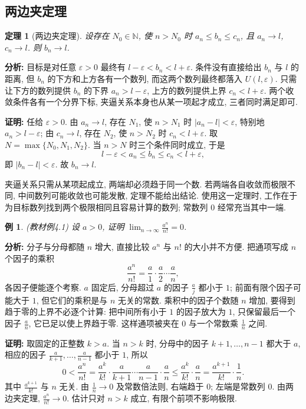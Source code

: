 \documentclass[UTF8,openany]{ctexbook}
\theoremstyle{chinesetextbook}
\newtheorem{example}{例}[section]
\newtheorem{theorem}{定理}[section]
\newenvironment{cnproof}{\par\indent\textbf{证明:} \ignorespaces}{\par}
\begin{document}
\subsection{两边夹定理}
\begin{theorem}[两边夹定理]
设存在 $N_0\in\mathbb N$, 使 $n>N_0$ 时 $a_n\le b_n\le c_n$, 且 $a_n\to l$, $c_n\to l$. 则 $b_n\to l$.
\end{theorem}
\par\indent\textbf{分析:} 目标是对任意 $\varepsilon>0$ 最终有 $l-\varepsilon<b_n<l+\varepsilon$. 条件没有直接给出 $b_n$ 与 $l$ 的距离, 但 $b_n$ 的下方和上方各有一个数列, 而这两个数列最终都落入 $U(l,\varepsilon)$. 只需让下方的数列提供 $b_n$ 的下界 $a_n>l-\varepsilon$, 上方的数列提供上界 $c_n<l+\varepsilon$. 两个收敛条件各有一个分界下标, 夹逼关系本身也从某一项起才成立, 三者同时满足即可.
\begin{cnproof}
任给 $\varepsilon>0$. 由 $a_n\to l$, 存在 $N_1$, 使 $n>N_1$ 时 $|a_n-l|<\varepsilon$, 特别地 $a_n>l-\varepsilon$; 由 $c_n\to l$, 存在 $N_2$, 使 $n>N_2$ 时 $c_n<l+\varepsilon$. 取 $N=\max\{N_0,N_1,N_2\}$. 当 $n>N$ 时三个条件同时成立, 于是
\[
l-\varepsilon<a_n\le b_n\le c_n<l+\varepsilon,
\]
即 $|b_n-l|<\varepsilon$. 故 $b_n\to l$.
\end{cnproof}
夹逼关系只需从某项起成立, 两端却必须趋于同一个数. 若两端各自收敛而极限不同, 中间数列可能收敛也可能发散, 定理不能给出结论. 使用这一定理时, 工作在于为目标数列找到两个极限相同且容易计算的数列; 常数列 $0$ 经常充当其中一端.
\begin{example}
\textnormal{(教材例4.1)} 设 $a>0$, 证明 $\displaystyle \lim_{n\to\infty}\frac{a^n}{n!}=0$.
\end{example}
\par\indent\textbf{分析:} 分子与分母都随 $n$ 增大, 直接比较 $a^n$ 与 $n!$ 的大小并不方便. 把通项写成 $n$ 个因子的乘积
\[
\frac{a^n}{n!}=\frac a1\cdot\frac a2\cdots\frac an,
\]
各因子便能逐个考察. $a$ 固定后, 分母超过 $a$ 的因子 $\displaystyle\frac aj$ 都小于 $1$; 前面有限个因子可能大于 $1$, 但它们的乘积是与 $n$ 无关的常数. 乘积中的因子个数随 $n$ 增加, 要得到趋于零的上界不必逐个计算: 把中间所有小于 $1$ 的因子放大为 $1$, 只保留最后一个因子 $\displaystyle\frac an$, 它已足以使上界趋于零. 这样通项被夹在 $0$ 与一个常数乘 $\displaystyle\frac1n$ 之间.
\begin{cnproof}
取固定的正整数 $k>a$. 当 $n>k$ 时, 分母中的因子 $k+1,\ldots,n-1$ 都大于 $a$, 相应的因子 $\displaystyle\frac a{k+1},\ldots,\frac a{n-1}$ 都小于 $1$, 所以
\[
0<\frac{a^n}{n!}
=\frac{a^k}{k!}\cdot\frac a{k+1}\cdots\frac a{n-1}\cdot\frac an
\le\frac{a^k}{k!}\cdot\frac an
=\frac{a^{k+1}}{k!}\cdot\frac1n.
\]
其中 $\displaystyle\frac{a^{k+1}}{k!}$ 与 $n$ 无关. 由 $\displaystyle\frac1n\to0$ 及常数倍法则, 右端趋于 $0$; 左端是常数列 $0$. 由两边夹定理, $\displaystyle\frac{a^n}{n!}\to0$. 估计只对 $n>k$ 成立, 有限个前项不影响极限.
\end{cnproof}
\end{document}
